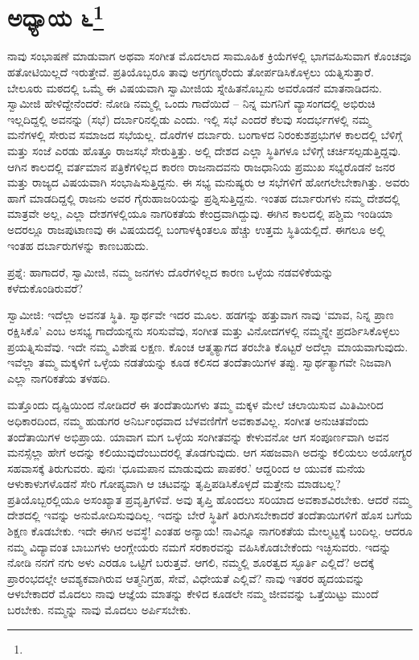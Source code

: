 \newpage

\chapter[ಅಧ್ಯಾಯ ೬]{ಅಧ್ಯಾಯ ೬\protect\footnote{}}

ನಾವು ಸಂಭಾಷಣೆ ಮಾಡುವಾಗ ಅಥವಾ ಸಂಗೀತ ಮೊದಲಾದ ಸಾಮೂಹಿಕ ಕ್ರಿಯೆಗಳಲ್ಲಿ ಭಾಗವಹಿಸುವಾಗ ಕೊಂಚವೂ ಹತೋಟಿಯಿಲ್ಲದೆ ಇರುತ್ತೇವೆ. ಪ್ರತಿಯೊಬ್ಬರೂ ತಾವು ಅಗ್ರಗಣ್ಯರೆಂದು ತೋರ್ಪಡಿಸಿಕೊಳ್ಳಲು ಯತ್ನಿಸುತ್ತಾರೆ. ಬೇಲೂರು ಮಠದಲ್ಲಿ ಒಮ್ಮೆ ಈ ವಿಷಯವಾಗಿ ಸ್ವಾಮೀಜಿಯ ಸ್ನೇಹಿತನೊಬ್ಬನು ಅವರೊಡನೆ ಮಾತನಾಡಿದನು. ಸ್ವಾಮೀಜಿ ಹೇಳಿದ್ದೇನೆಂದರೆ: ನೋಡಿ ನಮ್ಮಲ್ಲಿ ಒಂದು ಗಾದೆಯಿದೆ – ನಿನ್ನ ಮಗನಿಗೆ ವ್ಯಾಸಂಗದಲ್ಲಿ ಅಭಿರುಚಿ ಇಲ್ಲದಿದ್ದಲ್ಲಿ ಅವನನ್ನು (ಸಭೆ) ದರ್ಬಾರಿನಲ್ಲಿಡು ಎಂದು. ಇಲ್ಲಿ ಸಭೆ ಎಂದರೆ ಕೆಲವು ಸಂದರ್ಭಗಳಲ್ಲಿ ನಮ್ಮ ಮನೆಗಳಲ್ಲಿ ಸೇರುವ ಸಮಾಜದ ಸಭೆಯಲ್ಲ. ದೊರೆಗಳ ದರ್ಬಾರು. ಬಂಗಾಳದ ನಿರಂಕುಶಪ್ರಭುಗಳ ಕಾಲದಲ್ಲಿ ಬೆಳಿಗ್ಗೆ ಮತ್ತು ಸಂಜೆ ಎರಡು ಹೊತ್ತೂ ರಾಜಸಭೆ ಸೇರುತ್ತಿತ್ತು. ಅಲ್ಲಿ ದೇಶದ ಎಲ್ಲಾ ಸ್ಥಿತಿಗಳೂ ಬೆಳಿಗ್ಗೆ ಚರ್ಚಿಸಲ್ಪಡುತ್ತಿದ್ದವು. ಆಗಿನ ಕಾಲದಲ್ಲಿ ವರ್ತಮಾನ ಪತ್ರಿಕೆಗಳಿಲ್ಲದ ಕಾರಣ ರಾಜನಾದವನು ರಾಜಧಾನಿಯ ಪ್ರಮುಖ ಸಭ್ಯರೊಡನೆ ಜನರ ಮತ್ತು ರಾಜ್ಯದ ವಿಷಯವಾಗಿ ಸಂಭಾಷಿಸುತ್ತಿದ್ದನು. ಈ ಸಭ್ಯ ಮನುಷ್ಯರು ಆ ಸಭೆಗಳಿಗೆ ಹೋಗಲೇಬೇಕಾಗಿತ್ತು. ಅವರು ಹಾಗೆ ಮಾಡದಿದ್ದಲ್ಲಿ ರಾಜನು ಅವರ ಗೈರುಹಾಜರಿಯನ್ನು ಪ್ರಶ್ನಿಸುತ್ತಿದ್ದನು. ಇಂತಹ ದರ್ಬಾರುಗಳು ನಮ್ಮ ದೇಶದಲ್ಲಿ ಮಾತ್ರವೇ ಅಲ್ಲ, ಎಲ್ಲಾ ದೇಶಗಳಲ್ಲಿಯೂ ನಾಗರಿಕತೆಯ ಕೇಂದ್ರವಾಗಿದ್ದುವು. ಈಗಿನ ಕಾಲದಲ್ಲಿ ಪಶ್ಚಿಮ ಇಂಡಿಯಾ ಅದರಲ್ಲೂ ರಾಜಪುಟಾಣವು ಈ ವಿಷಯದಲ್ಲಿ ಬಂಗಾಳಕ್ಕಿಂತಲೂ ಹೆಚ್ಚು ಉತ್ತಮ ಸ್ಥಿತಿಯಲ್ಲಿದೆ. ಈಗಲೂ ಅಲ್ಲಿ ಇಂತಹ ದರ್ಬಾರುಗಳನ್ನು ಕಾಣಬಹುದು.

ಪ್ರಶ್ನೆ: ಹಾಗಾದರೆ, ಸ್ವಾಮೀಜಿ, ನಮ್ಮ ಜನಗಳು ದೊರೆಗಳಿಲ್ಲದ ಕಾರಣ ಒಳ್ಳೆಯ ನಡವಳಿಕೆಯನ್ನು ಕಳೆದುಕೊಂಡಿರುವರೆ?

ಸ್ವಾಮೀಜಿ: ಇದೆಲ್ಲಾ ಅವನತ ಸ್ಥಿತಿ. ಸ್ವಾರ್ಥವೇ ಇದರ ಮೂಲ. ಹಡಗನ್ನು ಹತ್ತುವಾಗ ನಾವು ‘ಮಾವ, ನಿನ್ನ ಪ್ರಾಣ ರಕ್ಷಿಸಿಕೊ’ ಎಂಬ ಅಸಭ್ಯ ಗಾದೆಯನ್ನನು ಸರಿಸುವೆವು, ಸಂಗೀತ ಮತ್ತು ವಿನೋದಗಳಲ್ಲಿ ನಮ್ಮನ್ನೇ ಪ್ರದರ್ಶಿಸಿಕೊಳ್ಳಲು ಪ್ರಯತ್ನಿಸುವೆವು. ಇದೇ ನಮ್ಮ ವಿಶೇಷ ಲಕ್ಷಣ. ಕೊಂಚ ಆತ್ಮತ್ಯಾಗದ ತರಬೇತಿ ಕೊಟ್ಟರೆ ಅದೆಲ್ಲಾ ಮಾಯವಾಗುವುದು. ಇವೆಲ್ಲಾ ತಮ್ಮ ಮಕ್ಕಳಿಗೆ ಒಳ್ಳೆಯ ನಡತೆಯನ್ನು ಕೂಡ ಕಲಿಸದ ತಂದೆತಾಯಿಗಳ ತಪ್ಪು. ಸ್ವಾರ್ಥತ್ಯಾಗವೇ ನಿಜವಾಗಿ ಎಲ್ಲಾ ನಾಗರಿಕತೆಯ ತಳಹದಿ.

ಮತ್ತೊಂದು ದೃಷ್ಟಿಯಿಂದ ನೋಡಿದರೆ ಈ ತಂದೆತಾಯಿಗಳು ತಮ್ಮ ಮಕ್ಕಳ ಮೇಲೆ ಚಲಾಯಿಸುವ ಮಿತಿಮೀರಿದ ಅಧಿಕಾರದಿಂದ, ನಮ್ಮ ಹುಡುಗರ ಅನಿರ್ಬಂಧವಾದ ಬೆಳವಣಿಗೆಗೆ ಅವಕಾಶವಿಲ್ಲ. ಸಂಗೀತ ಅನುಚಿತವೆಂದು ತಂದೆತಾಯಿಗಳ ಅಭಿಪ್ರಾಯ. ಯಾವಾಗ ಮಗ ಒಳ್ಳೆಯ ಸಂಗೀತವನ್ನು ಕೇಳುವನೋ ಆಗ ಸಂಪೂರ್ಣವಾಗಿ ಅವನ ಮನಸ್ಸೆಲ್ಲಾ ಹೇಗೆ ಅದನ್ನು ಕಲಿಯುವುದೆಂಬುದರಲ್ಲಿ ತೊಡಗುವುದು. ಆಗ ಸಹಜವಾಗಿ ಅದನ್ನು ಕಲಿಯಲು ಅಯೋಗ್ಯರ ಸಹವಾಸಕ್ಕೆ ತಿರುಗುವರು. ಪುನಃ ‘ಧೂಮಪಾನ ಮಾಡುವುದು ಪಾಪಕರ.’ ಆದ್ದರಿಂದ ಆ ಯುವಕ ಮನೆಯ ಆಳುಕಾಳುಗಳೊಡನೆ ಸೇರಿ ಗೋಪ್ಯವಾಗಿ ಆ ಚಟವನ್ನು ತೃಪ್ತಿಪಡಿಸಿಕೊಳ್ಳದೆ ಮತ್ತೇನು ಮಾಡಬಲ್ಲ? ಪ್ರತಿಯೊಬ್ಬರಲ್ಲಿಯೂ ಅಸಂಖ್ಯಾತ ಪ್ರವೃತ್ತಿಗಳಿವೆ. ಅವು ತೃಪ್ತಿ ಹೊಂದಲು ಸರಿಯಾದ ಅವಕಾಶವಿರಬೇಕು. ಆದರೆ ನಮ್ಮ ದೇಶದಲ್ಲಿ ಇವನ್ನು ಅನುಮೋದಿಸುವುದಿಲ್ಲ. ಇದನ್ನು ಬೇರೆ ಸ್ಥಿತಿಗೆ ತಿರುಗಿಸಬೇಕಾದರೆ ತಂದೆತಾಯಿಗಳಿಗೆ ಹೊಸ ಬಗೆಯ ಶಿಕ್ಷಣ ಕೊಡಬೇಕು. ಇದೇ ಈಗಿನ ಅವಸ್ಥೆ! ಎಂತಹ ಅನ್ಯಾಯ! ನಾವಿನ್ನೂ ನಾಗರಿಕತೆಯ ಮೇಲ್ಮಟ್ಟಕ್ಕೆ ಬಂದಿಲ್ಲ. ಆದರೂ ನಮ್ಮ ವಿದ್ಯಾವಂತ ಬಾಬುಗಳು ಆಂಗ್ಲೇಯರು ನಮಗೆ ಸರಕಾರವನ್ನು ವಹಿಸಿಕೊಡಬೇಕೆಂದು ಇಚ್ಛಿಸುವರು. ಇದನ್ನು ನೋಡಿ ನನಗೆ ನಗು ಅಳು ಎರಡೂ ಒಟ್ಟಿಗೆ ಬರುತ್ತವೆ. ಆಗಲಿ, ನಮ್ಮಲ್ಲಿ ಶೂರತ್ವದ ಸ್ಫೂರ್ತಿ ಎಲ್ಲಿದೆ? ಅದಕ್ಕೆ ಪ್ರಾರಂಭದಲ್ಲೇ ಆವಶ್ಯಕವಾಗಿರುವ ಆತ್ಮನಿಗ್ರಹ, ಸೇವೆ, ವಿಧೇಯತೆ ಎಲ್ಲಿವೆ? ನಾವು ಇತರರ ಹೃದಯವನ್ನು ಆಳಬೇಕಾದರೆ ಮೊದಲು ನಾವು ಆಜ್ಞೆಯ ಮಾತನ್ನು ಕೇಳಿದ ಕೂಡಲೇ ನಮ್ಮ ಜೀವವನ್ನು ಒತ್ತೆಯಿಟ್ಟು ಮುಂದೆ ಬರಬೇಕು. ನಮ್ಮನ್ನು ನಾವು ಮೊದಲು ಅರ್ಪಿಸಬೇಕು.

